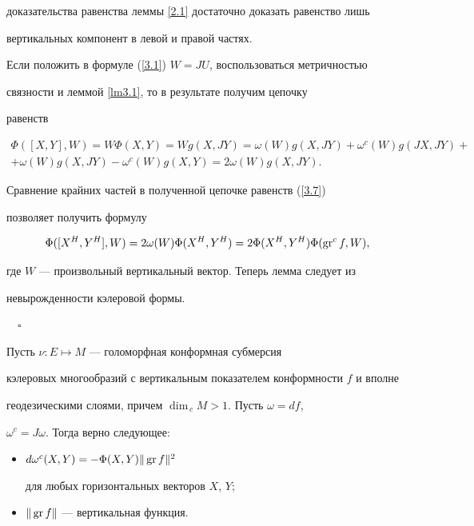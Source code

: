доказательства равенства леммы \ref{2.1} достаточно доказать равенство лишь


вертикальных компонент в левой и правой частях.





Если положить в формуле (\ref{3.1}) $W=JU$, воспользоваться метричностью


связности и леммой \ref{lm3.1}, то в результате получим цепочку


равенств


\begin{multline}


\Phi ([X,Y],W)=W\Phi (X,Y)=Wg(X,JY)=


\omega (W)g(X,JY)+\omega^c(W) g(JX,JY)+ \\


+\omega (W)g(X,JY)-\omega^c(W)g(X,Y)=2\omega (W)g(X,JY).


\label{3.7}


\end{multline}


Сравнение крайних частей в полученной цепочке равенств (\ref{3.7})


позволяет получить формулу


$$


\Phi ([X^H,Y^H],W)=2\omega (W)\Phi (X^H,Y^H)=2\Phi (X^H,Y^H)\Phi (\gr^c f,W),


$$


где $W$ --- произвольный вертикальный вектор. Теперь лемма следует из


невырожденности кэлеровой формы.


$\quad\square$





\begin{lems}\label{lm3.3}


Пусть $\nu:E\mapsto M$ --- голоморфная конформная субмерсия


кэлеровых многообразий с вертикальным показателем конформности $f$ и вполне


геодезическими слоями, причем $\dim_{\, c}M>1$. Пусть $\omega =df$,


$\omega^c=J\omega$. Тогда верно следующее$:$


\begin{itemize}


\item[а)] $d\omega^c(X,Y)=-\Phi (X,Y)\|\operatorname{gr} f\|^2$


для любых горизонтальных векторов $X$, $Y;$


\item[б)] $\|\operatorname{gr} f\|$ --- вертикальная функция.


\end{itemize}


\end{lems}





